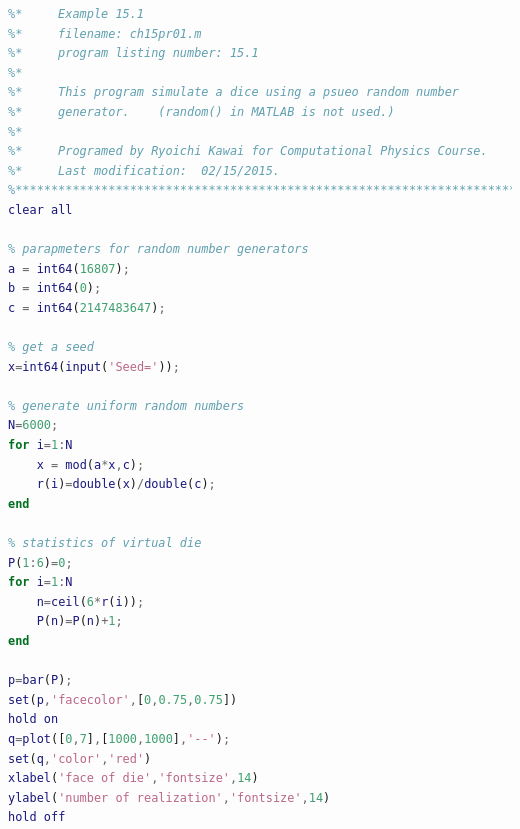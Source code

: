 \noindent
\program
\label{prog:virtual_die}
\footnotesize
\begin{lstlisting}[language=matlab]
%**************************************************************************
%*     Example 15.1                                                       *
%*     filename: ch15pr01.m                                               *
%*     program listing number: 15.1                                       *
%*                                                                        *
%*     This program simulate a dice using a psueo random number           *
%*     generator.    (random() in MATLAB is not used.)                    *
%*                                                                        *
%*     Programed by Ryoichi Kawai for Computational Physics Course.       *
%*     Last modification:  02/15/2015.                                    *
%**************************************************************************
clear all

% parapmeters for random number generators
a = int64(16807);
b = int64(0); 
c = int64(2147483647);

% get a seed
x=int64(input('Seed='));

% generate uniform random numbers
N=6000;
for i=1:N
    x = mod(a*x,c);
    r(i)=double(x)/double(c);
end
 
% statistics of virtual die
P(1:6)=0;
for i=1:N
    n=ceil(6*r(i));
    P(n)=P(n)+1;
end

p=bar(P);
set(p,'facecolor',[0,0.75,0.75])
hold on
q=plot([0,7],[1000,1000],'--');
set(q,'color','red')
xlabel('face of die','fontsize',14)
ylabel('number of realization','fontsize',14)
hold off
\end{lstlisting}
\normalsize


